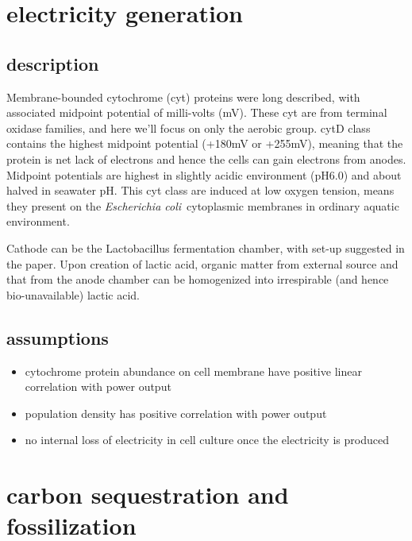 \documentclass[a4paper,11pt]{article}
\newcommand{\ec}{\textit{Escherichia coli}}
\begin{document}
    \section{electricity generation}
    \subsection{description}
        Membrane-bounded cytochrome (cyt) proteins were long described\autocite{gennis1987cytochromes,edwards2000escherichia}, with associated midpoint potential of milli-volts (mV).  These cyt are from terminal oxidase families, and here we'll focus on only the aerobic group.  cytD class contains the highest midpoint potential (+180mV\autocite{gennis1987cytochromes} or +255mV\autocite{lorence1984effects}), meaning that the protein is net lack of electrons and hence the cells can gain electrons from anodes.  Midpoint potentials are highest in slightly acidic environment (pH6.0) and about halved in seawater pH\autocite{lorence1984effects}.  This cyt class are induced at low oxygen tension\autocite{gennis1987cytochromes}, means they present on the \ec\ cytoplasmic membranes in ordinary aquatic environment.
        
        Cathode can be the Lactobacillus fermentation chamber\autocite{min2005electricity}, with set-up suggested in the paper.  Upon creation of lactic acid, organic matter from external source and that from the anode chamber can be homogenized into irrespirable (and hence bio-unavailable) lactic acid.
    \subsection{assumptions}
    \begin{itemize}
        \item cytochrome protein abundance on cell membrane have positive linear correlation with power output
        \item population density has positive correlation with power output
        \item no internal loss of electricity in cell culture once the electricity is produced
    \end{itemize}
    
    \section{carbon sequestration and fossilization}
\end{document}
